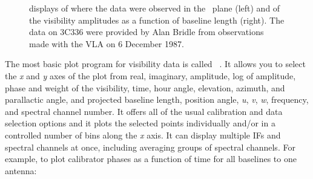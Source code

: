 
\begin{figure}
\centering
\caption[{\tt UVPLT} displays]{{\tt {}} displays of where
the data were observed in the \uv\ plane (left) and of the visibility
amplitudes as a function of baseline length (right).  The data on
3C336 were provided by Alan Bridle from observations made with the VLA
on 6 December 1987.}
\label{fig:uvplt}
\end{figure}

     The most basic plot program for visibility data is called {\tt
{}}\@.  It allows you to select the {\it x\/} and {\it y\/}
axes of the plot from real, imaginary, amplitude, log of amplitude,
phase and weight of the visibility, time, hour angle, elevation,
azimuth, and parallactic angle, and projected baseline length,
position angle, {\it u\/}, {\it v\/}, {\it w\/}, frequency, and
spectral channel number.  It offers all of the usual calibration and
data selection options and it plots the selected points individually
and/or in a controlled number of bins along the {\it x\/} axis.  It
can display multiple IFs and spectral channels at once, including
averaging groups of spectral channels.  For example, to plot
calibrator phases as a function of time for all baselines to one
antenna:
\pd

